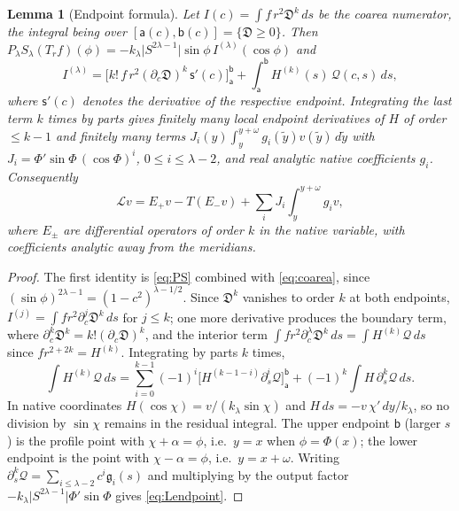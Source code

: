 \documentclass[11pt]{amsart}
\numberwithin{equation}{section}
\newtheorem{lemma}[theorem]{Lemma}
\theoremstyle{definition}
\theoremstyle{remark}
\newcommand{\abs}[1]{\lvert #1\rvert}
\newcommand{\Disc}{\mathfrak D}
\begin{document}
\begin{lemma}[Endpoint formula]\label{lem:endpoint}
Let $I(c)=\int f\,r^2\Disc^k\,ds$ be the coarea numerator, the integral being over $[\mathsf a(c),\mathsf b(c)]=\{\Disc\ge0\}$. Then $P_\lambda S_\lambda(T_rf)(\phi)=-k_\lambda\abs{S^{2\lambda-1}}\sin\phi\,I^{(\lambda)}(\cos\phi)$ and
\begin{equation}\label{eq:endpoint}
I^{(\lambda)}=\bigl[k!\,f\,r^2(\partial_c\Disc)^k\,\mathsf s'(c)\bigr]_{\mathsf a}^{\mathsf b}+\int_{\mathsf a}^{\mathsf b} H^{(k)}(s)\,\mathcal Q(c,s)\,ds ,
\end{equation}
where $\mathsf s'(c)$ denotes the derivative of the respective endpoint. Integrating the last term $k$ times by parts gives finitely many local endpoint derivatives of $H$ of order $\le k-1$ and finitely many terms $J_i(y)\int_y^{y+\omega}g_i(\tilde y)v(\tilde y)\,d\tilde y$ with $J_i=\Phi'\sin\Phi\,(\cos\Phi)^i$, $0\le i\le\lambda-2$, and real analytic native coefficients $g_i$. Consequently
\begin{equation}\label{eq:Lendpoint}
\mathcal Lv=E_+v-T(E_-v)+\sum_iJ_i\int_y^{y+\omega}g_iv,
\end{equation}
where $E_\pm$ are differential operators of order $k$ in the native variable, with coefficients analytic away from the meridians.
\end{lemma}

\begin{proof}
The first identity is \eqref{eq:PS} combined with \eqref{eq:coarea}, since $(\sin\phi)^{2\lambda-1}=(1-c^2)^{\lambda-1/2}$. Since $\Disc^k$ vanishes to order $k$ at both endpoints, $I^{(j)}=\int f r^2\partial_c^j\Disc^k\,ds$ for $j\le k$; one more derivative produces the boundary term, where $\partial_c^k\Disc^k=k!(\partial_c\Disc)^k$, and the interior term $\int fr^2\partial_c^\lambda\Disc^k\,ds=\int H^{(k)}\mathcal Q\,ds$ since $fr^{2+2k}=H^{(k)}$. Integrating by parts $k$ times,
\[
\int H^{(k)}\mathcal Q\,ds=\sum_{i=0}^{k-1}(-1)^i\bigl[H^{(k-1-i)}\partial_s^i\mathcal Q\bigr]_{\mathsf a}^{\mathsf b}+(-1)^k\int H\,\partial_s^k\mathcal Q\,ds .
\]
In native coordinates $H(\cos\chi)=v/(k_\lambda\sin\chi)$ and $H\,ds=-v\,\chi'\,dy/k_\lambda$, so no division by $\sin\chi$ remains in the residual integral. The upper endpoint $\mathsf b$ (larger $s$) is the profile point with $\chi+\alpha=\phi$, i.e.\ $y=x$ when $\phi=\Phi(x)$; the lower endpoint is the point with $\chi-\alpha=\phi$, i.e.\ $y=x+\omega$. Writing $\partial_s^k\mathcal Q=\sum_{i\le\lambda-2}c^i\mathfrak g_i(s)$ and multiplying by the output factor $-k_\lambda\abs{S^{2\lambda-1}}\Phi'\sin\Phi$ gives \eqref{eq:Lendpoint}.
\end{proof}
\end{document}
